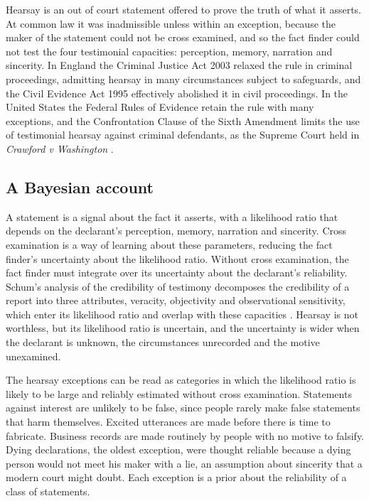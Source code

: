 Hearsay is an out of court statement offered to prove the truth of what it asserts. At common law it was inadmissible unless within an exception, because the maker of the statement could not be cross examined, and so the fact finder could not test the four testimonial capacities: perception, memory, narration and sincerity. In England the Criminal Justice Act 2003 relaxed the rule in criminal proceedings, admitting hearsay in many circumstances subject to safeguards, and the Civil Evidence Act 1995 effectively abolished it in civil proceedings. In the United States the Federal Rules of Evidence retain the rule with many exceptions, and the Confrontation Clause of the Sixth Amendment limits the use of testimonial hearsay against criminal defendants, as the Supreme Court held in \emph{Crawford v Washington} \citep{crawford2004}.

\subsection{A Bayesian account}

A statement is a signal about the fact it asserts, with a likelihood ratio that depends on the declarant's perception, memory, narration and sincerity. Cross examination is a way of learning about these parameters, reducing the fact finder's uncertainty about the likelihood ratio. Without cross examination, the fact finder must integrate over its uncertainty about the declarant's reliability. Schum's analysis of the credibility of testimony decomposes the credibility of a report into three attributes, veracity, objectivity and observational sensitivity, which enter its likelihood ratio and overlap with these capacities \citep{schum1994}. Hearsay is not worthless, but its likelihood ratio is uncertain, and the uncertainty is wider when the declarant is unknown, the circumstances unrecorded and the motive unexamined.

The hearsay exceptions can be read as categories in which the likelihood ratio is likely to be large and reliably estimated without cross examination. Statements against interest are unlikely to be false, since people rarely make false statements that harm themselves. Excited utterances are made before there is time to fabricate. Business records are made routinely by people with no motive to falsify. Dying declarations, the oldest exception, were thought reliable because a dying person would not meet his maker with a lie, an assumption about sincerity that a modern court might doubt. Each exception is a prior about the reliability of a class of statements.

